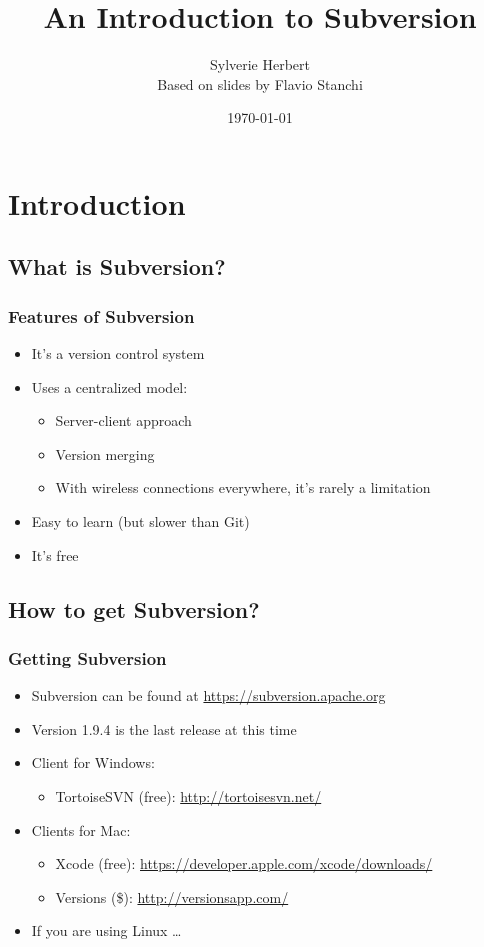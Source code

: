 \documentclass{beamer}
\title{An Introduction to Subversion}
\author{Sylverie Herbert \\ Based on slides by Flavio Stanchi}
\date{\today}
\begin{document}
\frame{\titlepage}

\section{Introduction}

\subsection{What is Subversion?}

\frame
{
  \frametitle{Features of Subversion}

  \begin{itemize}
  \item It's a version control system
  \item Uses a centralized model:
  	\begin{itemize}
  	\item Server-client approach
  	\item Version merging
	\item With wireless connections everywhere, it's rarely a limitation
  	\end{itemize}
  \item Easy to learn (but slower than Git)
  \item It's free
  \end{itemize}
}

\subsection{How to get Subversion?}

\frame
{
  \frametitle{Getting Subversion}
  
  \begin{itemize}
  \item<1-> Subversion can be found at \url{https://subversion.apache.org}
  \item<2-> Version 1.9.4 is the last release at this time
  \item<3-> Client for Windows:
  	\begin{itemize}
	\item<3-> TortoiseSVN (free): \url{http://tortoisesvn.net/}
	\end{itemize}
  \item<4-> Clients for Mac:
  	\begin{itemize}
	\item<4-> Xcode (free): \url{https://developer.apple.com/xcode/downloads/}
	\item<4-> Versions (\$): \url{http://versionsapp.com/}
	\end{itemize}
  \item<5-> If you are using Linux \dots 
  		 \uncover<6->{use the terminal!}
  \end{itemize}
}
\end{document}
